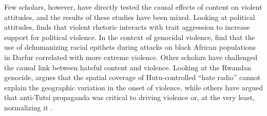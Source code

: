 \documentclass[12pt, letterpaper]{article}
\begin{document}
Few scholars, however, have directly tested the causal effects of content on violent attitudes, and the results of these studies have been mixed. Looking at political attitudes, \cite{kalmoe2014fueling} finds that violent rhetoric interacts with trait aggression to increase support for political violence. In the context of genocidal violence, \cite{hagan2008darfur} find that the use of dehumanizing racial epithets during attacks on black African populations in Darfur correlated with more extreme violence. Other scholars have challenged the causal link between hateful content and violence. Looking at the Rwandan genocide, \cite{straus2007relationship} argues that the spatial coverage of Hutu-controlled ``hate radio'' cannot explain the geographic variation in the onset of violence, while others have argued that anti-Tutsi propaganda was critical to driving violence or, at the very least, normalizing it \citep{fujii2004transforming, yanagizawa2014propaganda}.
\end{document}
